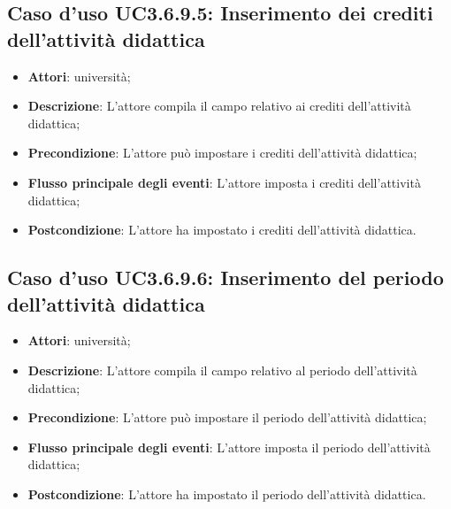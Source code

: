 \subsection{Caso d'uso \texorpdfstring{UC3.6.9.5}{UC3.6.9.5}: Inserimento dei crediti dell’attività didattica}
\begin{itemize}
\item \textbf{Attori}: università;
\item \textbf{Descrizione}: L'attore compila il campo relativo ai crediti dell'attività didattica;

\item \textbf{Precondizione}: L'attore può impostare i crediti dell'attività didattica;

\item \textbf{Flusso principale degli eventi}: L'attore imposta i crediti dell'attività didattica;

\item \textbf{Postcondizione}: L'attore ha impostato i crediti dell'attività didattica.

\end{itemize}
\subsection{Caso d'uso \texorpdfstring{UC3.6.9.6}{UC3.6.9.6}: Inserimento del periodo dell’attività didattica}
\begin{itemize}
\item \textbf{Attori}: università;
\item \textbf{Descrizione}: L'attore compila il campo relativo al periodo dell'attività didattica;

\item \textbf{Precondizione}: L'attore può impostare il periodo dell'attività didattica;

\item \textbf{Flusso principale degli eventi}: L'attore imposta il periodo dell'attività didattica;

\item \textbf{Postcondizione}: L'attore ha impostato il periodo dell'attività didattica.

\end{itemize}
